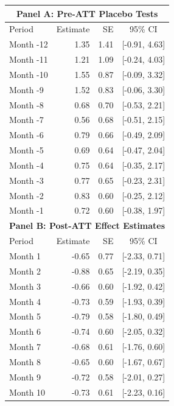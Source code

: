 
    
    \begin{tabular}{lrrc}
        \toprule
        \multicolumn{4}{c}{\textbf{Panel A: Pre-ATT Placebo Tests}} \\
        \midrule
        Period & Estimate & SE & 95\% CI \\
        \midrule
        Month -12 & 1.35 & 1.41 & [-0.91, 4.63] \\
        Month -11 & 1.21 & 1.09 & [-0.24, 4.03] \\
        Month -10 & 1.55 & 0.87 & [-0.09, 3.32] \\
        Month -9  & 1.52 & 0.83 & [-0.06, 3.30] \\
        Month -8  & 0.68 & 0.70 & [-0.53, 2.21] \\
        Month -7  & 0.56 & 0.68 & [-0.51, 2.15] \\
        Month -6  & 0.79 & 0.66 & [-0.49, 2.09] \\
        Month -5  & 0.69 & 0.64 & [-0.47, 2.04] \\
        Month -4  & 0.75 & 0.64 & [-0.35, 2.17] \\
        Month -3  & 0.77 & 0.65 & [-0.23, 2.31] \\
        Month -2  & 0.83 & 0.60 & [-0.25, 2.12] \\
        Month -1  & 0.72 & 0.60 & [-0.38, 1.97] \\
        \midrule
        \multicolumn{4}{c}{\textbf{Panel B: Post-ATT Effect Estimates}} \\
        \midrule
        Period & Estimate & SE & 95\% CI \\
        \midrule
        Month 1  & -0.65 & 0.77 & [-2.33, 0.71] \\
        Month 2  & -0.88 & 0.65 & [-2.19, 0.35] \\
        Month 3  & -0.66 & 0.60 & [-1.92, 0.42] \\
        Month 4  & -0.73 & 0.59 & [-1.93, 0.39] \\
        Month 5  & -0.79 & 0.58 & [-1.80, 0.49] \\
        Month 6  & -0.74 & 0.60 & [-2.05, 0.32] \\
        Month 7  & -0.68 & 0.61 & [-1.76, 0.60] \\
        Month 8  & -0.65 & 0.60 & [-1.67, 0.67] \\
        Month 9  & -0.72 & 0.58 & [-2.01, 0.27] \\
        Month 10 & -0.73 & 0.61 & [-2.23, 0.16] \\

\end{tabular}
